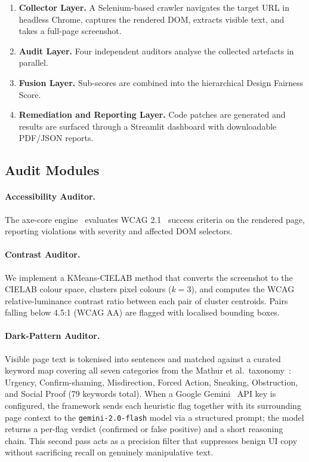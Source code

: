 \documentclass[runningheads]{llncs}
\begin{document}
\begin{enumerate}[leftmargin=*, topsep=3pt, itemsep=2pt]
  \item \textbf{Collector Layer.} A Selenium-based crawler navigates the target URL in headless Chrome, captures the rendered DOM, extracts visible text, and takes a full-page screenshot.
  \item \textbf{Audit Layer.} Four independent auditors analyse the collected artefacts in parallel.
  \item \textbf{Fusion Layer.} Sub-scores are combined into the hierarchical Design Fairness Score.
  \item \textbf{Remediation and Reporting Layer.} Code patches are generated and results are surfaced through a Streamlit dashboard with downloadable PDF/JSON reports.
\end{enumerate}

\subsection{Audit Modules}

\paragraph{Accessibility Auditor.}
The axe-core engine~\cite{axe} evaluates WCAG 2.1~\cite{wcag} success criteria on the rendered page, reporting violations with severity and affected DOM selectors.

\paragraph{Contrast Auditor.}
We implement a KMeans-CIELAB method that converts the screenshot to the CIELAB colour space, clusters pixel colours ($k=3$), and computes the WCAG relative-luminance contrast ratio between each pair of cluster centroids. Pairs falling below 4.5:1 (WCAG AA) are flagged with localised bounding boxes.

\paragraph{Dark-Pattern Auditor.}
Visible page text is tokenised into sentences and matched against a curated keyword map covering all seven categories from the Mathur et al.\ taxonomy~\cite{mathur2019}: Urgency, Confirm-shaming, Misdirection, Forced Action, Sneaking, Obstruction, and Social Proof (79 keywords total). When a Google Gemini~\cite{gemini} API key is configured, the framework sends each heuristic flag together with its surrounding page context to the \texttt{gemini-2.0-flash} model via a structured prompt; the model returns a per-flag verdict (confirmed or false positive) and a short reasoning chain. This second pass acts as a precision filter that suppresses benign UI copy without sacrificing recall on genuinely manipulative text.
\end{document}
